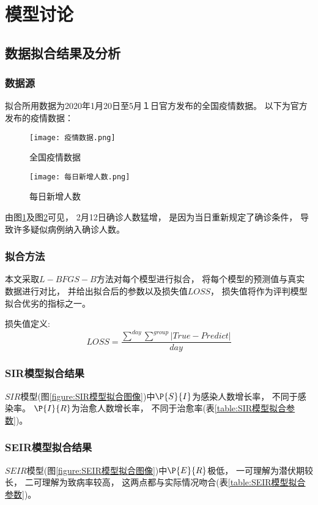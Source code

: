 \section{模型讨论}
\subsection{数据拟合结果及分析}
\subsubsection{数据源}
\par 拟合所用数据为2020年1月20日至5月１日官方发布的全国疫情数据。
以下为官方发布的疫情数据：
\begin{figure}[H]
    \centering
    \texttt{[image: 疫情数据.png]}
    \caption{全国疫情数据\label{figure:全国疫情数据}}
\end{figure}
\begin{figure}[H]
    \centering
    \texttt{[image: 每日新增人数.png]}
    \caption{每日新增人数\label{figure:每日新增人数}}
\end{figure}
\par
由图\ref{figure:全国疫情数据}及图\ref{figure:每日新增人数}可见，
2月12日确诊人数猛增，
是因为当日重新规定了确诊条件，
导致许多疑似病例纳入确诊人数。
\subsubsection{拟合方法}
\par 本文采取$L-BFGS-B$方法对每个模型进行拟合，
将每个模型的预测值与真实数据进行对比，
并给出拟合后的参数以及损失值$LOSS$，
损失值将作为评判模型拟合优劣的指标之一。
\par 损失值定义:
\begin{equation}
    LOSS = \frac{\sum\limits^{day}\sum\limits^{group}
        \left|True-Predict\right|}{day}
\end{equation}
\subsubsection{SIR模型拟合结果}
\par $SIR$模型(图\ref{figure:SIR模型拟合图像})中$\P{S}{I}$为感染人数增长率，
不同于感染率。
$\P{I}{R}$为治愈人数增长率，
不同于治愈率(表\ref{table:SIR模型拟合参数})。
\subsubsection{SEIR模型拟合结果}
\par $SEIR$模型(图\ref{figure:SEIR模型拟合图像})中$\P{E}{R}$极低，
一可理解为潜伏期较长，
二可理解为致病率较高，
这两点都与实际情况吻合(表\ref{table:SEIR模型拟合参数})。
